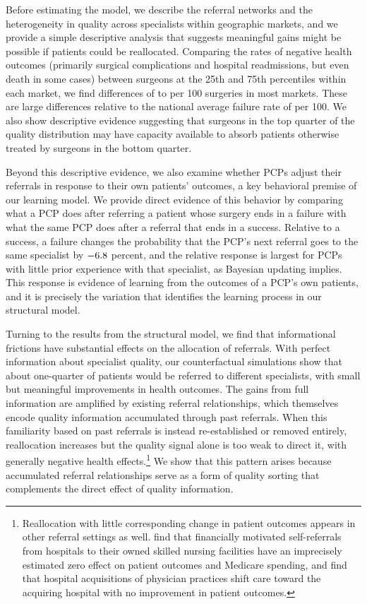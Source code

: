 \documentclass[12pt]{article}
\begin{document}
Before estimating the model, we describe the referral networks and the heterogeneity in quality across specialists within geographic markets, and we provide a simple descriptive analysis that suggests meaningful gains might be possible if patients could be reallocated. Comparing the rates of negative health outcomes (primarily surgical complications and hospital readmissions, but even death in some cases) between surgeons at the 25th and 75th percentiles within each market, we find differences of \failureIQRPten{} to \failureIQRPninety{} per 100 surgeries in most markets. These are large differences relative to the national average failure rate of \failureRateMean{} per 100. We also show descriptive evidence suggesting that surgeons in the top quarter of the quality distribution may have capacity available to absorb patients otherwise treated by surgeons in the bottom quarter.

Beyond this descriptive evidence, we also examine whether PCPs adjust their referrals in response to their own patients' outcomes, a key behavioral premise of our learning model. We provide direct evidence of this behavior by comparing what a PCP does after referring a patient whose surgery ends in a failure with what the same PCP does after a referral that ends in a success. Relative to a success, a failure changes the probability that the PCP's next referral goes to the same specialist by $-6.8{}$ percent, and the relative response is largest for PCPs with little prior experience with that specialist, as Bayesian updating implies. This response is evidence of learning from the outcomes of a PCP's own patients, and it is precisely the variation that identifies the learning process in our structural model.

Turning to the results from the structural model, we find that informational frictions have substantial effects on the allocation of referrals. With perfect information about specialist quality, our counterfactual simulations show that about one-quarter of patients would be referred to different specialists, with small but meaningful improvements in health outcomes. The gains from full information are amplified by existing referral relationships, which themselves encode quality information accumulated through past referrals. When this familiarity based on past referrals is instead re-established or removed entirely, reallocation increases but the quality signal alone is too weak to direct it, with generally negative health effects.\footnote{Reallocation with little corresponding change in patient outcomes appears in other referral settings as well. \cite{cutler2026} find that financially motivated self-referrals from hospitals to their owned skilled nursing facilities have an imprecisely estimated zero effect on patient outcomes and Medicare spending, and \cite{lin2025} find that hospital acquisitions of physician practices shift care toward the acquiring hospital with no improvement in patient outcomes.} We show that this pattern arises because accumulated referral relationships serve as a form of quality sorting that complements the direct effect of quality information.
\end{document}

